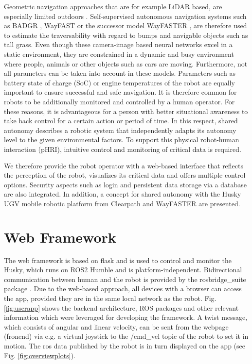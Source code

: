 \documentclass[letterpaper, 10 pt, conference]{ieeeconf}  %
\begin{document}
Geometric navigation approaches that are for example LiDAR based, are especially limited outdoors \cite{wayfast}.
Self-supervised autonomous navigation systems such as BADGR \cite{BADGR}, WayFAST \cite{wayfast} or the successor model WayFASTER \cite{wayfaster}, are therefore used to estimate the traversability with regard to bumps and navigable objects such as tall grass.
Even though these camera-image based neural networks excel in a static environment, they are constrained in a dynamic and busy environment where people, animals or other objects such as cars are moving.
Furthermore, not all parameters can be taken into account in these models. Parameters such as battery state of charge (SoC) or engine temperatures of the robot are equally important to ensure successful and safe navigation.
It is therefore common for robots to be additionally monitored and controlled by a human operator.
For these reasons, it is advantageous for a person with better situational awareness to take back control for a certain action or period of time. 
In this respect, shared autonomy describes a robotic system that independently adapts its autonomy level to the given environmental factors. 
To support this physical robot-human interaction (pHRI), intuitive control and monitoring of critical data is required.\cite{phri}

We therefore provide the robot operator with a web-based interface that reflects the perception of the robot, visualizes its critical data and offers multiple control options. 
Security aspects such as login and persistent data storage via a database are also integrated. 
In addition, a concept for shared autonomy with the Husky UGV mobile robotic platform from Clearpath \cite{husky} and WayFASTER are presented. 

\section{Web Framework}

The web framework is based on flask \cite{flask} and is used to control and monitor the Husky, which runs on ROS2 Humble and is platform-independent. 
Bidirectional communication between human and the robot is provided by the rosbridge\_suite package \cite{rosbridgeSuite}.   
Due to the web-based approach, all devices with a browser can access the app, provided they are in the same local network as the robot.
Fig. \ref{fig:userapp} shows the backend architecture, ROS packages and other relevant information which were leveraged for developing the framework. 
A twist message, which consists of angular and linear velocity, can be sent from the webpage (fronend) via e.g. 
a virtual joystick to the /cmd\_vel topic of the robot to set it in motion. The ros data published by the robot is in turn displayed on the app (see Fig. \ref{fig:overviewplots}).
\end{document}
